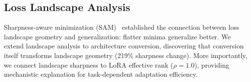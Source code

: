 \subsection{Loss Landscape Analysis}

Sharpness-aware minimization (SAM)~\cite{foret2021sam} established the connection between loss landscape geometry and generalization: flatter minima generalize better. We extend landscape analysis to architecture conversion, discovering that conversion itself transforms landscape geometry (219\% sharpness change). More importantly, we connect landscape sharpness to LoRA effective rank ($\rho=1.0$), providing mechanistic explanation for task-dependent adaptation efficiency.
